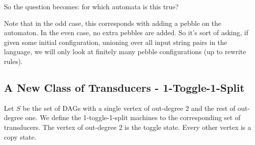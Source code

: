 \documentclass{article}
\newcommand{\0}{\underline{0}}
\newcommand{\1}{\underline{1}}
\newcommand{\2}{\underline{2}}
\begin{document}
So the question becomes: for which automata is this true?

Note that in the odd case, this corresponds with adding a pebble on the automaton. In the even case, no extra pebbles are added. So it's sort of asking, if given some initial configuration, unioning over all input string pairs in the language, we will only look at finitely many pebble configurations (up to rewrite rules).

\subsection*{A New Class of Transducers - 1-Toggle-1-Split}

Let $S$ be the set of DAGs with a single vertex of out-degree 2 and the rest of out-degree one. We define the 1-toggle-1-split machines to the corresponding set of transducers. The vertex of out-degree 2 is the toggle state. Every other vertex is a copy state.
\end{document}
